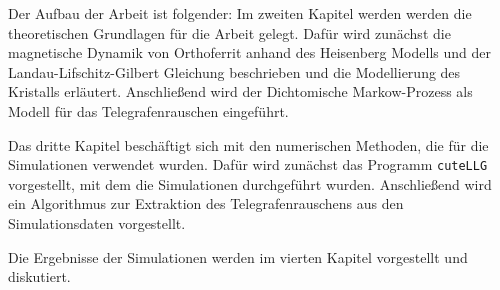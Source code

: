 \documentclass[main.tex]{subfiles}
\begin{document}
Der Aufbau der Arbeit ist folgender:
Im zweiten Kapitel werden werden die theoretischen Grundlagen für die Arbeit gelegt. Dafür wird zunächst die magnetische Dynamik von Orthoferrit anhand des Heisenberg Modells und der Landau-Lifschitz-Gilbert Gleichung beschrieben und die Modellierung des  Kristalls erläutert.
Anschließend wird der Dichtomische Markow-Prozess als Modell für das Telegrafenrauschen eingeführt.

Das dritte Kapitel beschäftigt sich mit den numerischen Methoden, die für die Simulationen verwendet wurden. Dafür wird zunächst das Programm \texttt{cuteLLG} vorgestellt, mit dem die Simulationen durchgeführt wurden. Anschließend wird ein Algorithmus zur Extraktion des Telegrafenrauschens aus den Simulationsdaten vorgestellt.

Die Ergebnisse der Simulationen werden im vierten Kapitel vorgestellt und diskutiert. 

\end{document}
